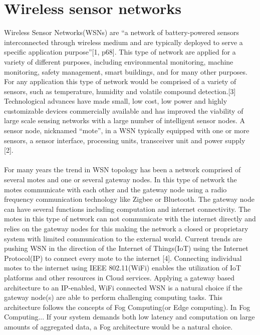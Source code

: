 \documentclass[]{uiophd}
\begin{document}
\section{Wireless sensor networks}
Wireless Sensor Networks(WSNs) are “a network of battery-powered sensors interconnected through wireless medium and are typically deployed to serve a specific application purpose”[1, p68]. This type of network are applied for a variety of different purposes, including environmental monitoring, machine monitoring, safety management, smart buildings, and for many other purposes. For any application this type of network would be comprised of a variety of sensors, such as temperature, humidity and volatile compound detection.[3] Technological advances have made small, low cost, low power and highly customizable devices commercially available and has improved the viability of large scale sensing networks with a large number of intelligent sensor nodes. A sensor node, nicknamed “mote”, in a WSN typically equipped with one or more sensors, a sensor interface, processing units, transceiver unit and power supply [2]. 
\\\\
For many years the trend in WSN topology has been a network comprised of several motes and one or several gateway nodes. In this type of network the motes communicate with each other and the gateway node using a radio frequency communication technology like Zigbee or Bluetooth. The gateway node can have several functions including computation and internet connectivity. The motes in this type of network can not communicate with the internet directly and relies on the gateway nodes for this making the network a closed or proprietary system with limited communication to the external world. Current trends are pushing WSN in the direction of the Internet of Things(IoT) using the Internet Protocol(IP) to connect every mote to the internet [4]. Connecting individual motes to the internet using  IEEE 802.11(WiFi) enables the utilization of IoT platforms and other resources in Cloud services. Applying a gateway based architecture to an IP-enabled, WiFi connected WSN is a natural choice if the gateway node(s) are able to perform challenging computing tasks. This architecture follows the concepts of Fog Computing(or Edge computing). In Fog Computing... If your system demands both low latency and computation on large amounts of aggregated data, a Fog architecture would be a natural choice. 
\\\\
\end{document}
